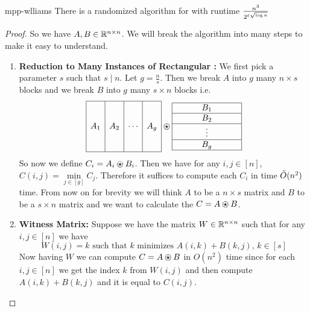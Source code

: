 \begin{theorem}{\cite{Williams_2014_Fap_CONF}}{mpp-wlliams}
	There is a randomized algorithm for  with runtime $\frac{n^3}{2^{\varepsilon\sqrt{\log n}}}$
\end{theorem}
\begin{proof}
	So we have $A,B\in\mathbb{R}^{n\times n}$. We will break the algorithm into many steps to make it easy to understand.
	\begin{enumerate}[wide, label=\bfseries Step \arabic*,itemindent=0.5cm]
		\item \textbf{Reduction to Many Instances of Rectangular :} We first pick a parameter $s$ such that $s\mid n$. Let $g=\frac{n}{s}$. Then we break $A$ into $g$ many $n\times s$ blocks and we break $B$ into $g$ many $s\times n$ blocks i.e. $$\begin{array}{|c|c|c|c|}
			\hline
			& & & \\
		 & & & \\
			A_1 & A_2 & \cdots & A_g\\
			& & & \\
			& & & \\\hline
		\end{array}\ostar \begin{array}{|ccccccc|}
		\hline
		& & & B_1 & & &\\ \hline
		& & & B_2 & & &\\\hline
		& & & \vdots & & &\\\hline
		& & & B_g & & &\\\hline
	\end{array}$$
So now we define $C_i=A_i\ostar B_i$. Then we have for any $i,j\in[n]$, $C(i,j)=\min\limits_{j\in [g]}C_j$. Therefore it suffices to compute each $C_i$ in time $\tilde{O}(n^2)$ time. From now on for brevity we will think $A$ to be a $n\times s$ matrix and $B$ to be a $s\times n$ matrix and we want to calculate the $C=A\ostar B$.
\item \textbf{Witness Matrix:} Suppose we have the matrix $W\in\mathbb{R}^{n\times n}$ such that for any $i,j\in[n]$ we have $$W(i,j)=k\text{ such that $k$ minimizes $A(i,k)+B(k,j)$, $k\in[s]$}$$Now having $W$ we can compute $C=A\ostar B$ in $O(n^2)$ time since for each $i,j\in[n]$ we get the index $k$ from $W(i,j)$ and then compute $A(i,k)+B(k,j)$ and it is equal to $C(i,j)$.\parinn


\end{enumerate}
\end{proof}
